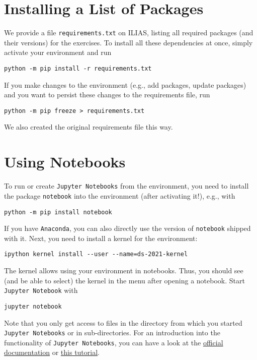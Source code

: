 \documentclass[12pt]{article}
\newcommand{\code}[1]{\textcolor{kitgreen}{\texttt{#1}}}
\begin{document}
\section{Installing a List of Packages}

We provide a file \code{requirements.txt} on ILIAS, listing all required packages (and their versions) for the exercises.
To install all these dependencies at once, simply activate your environment and run
%
\begin{lstlisting}[style=cmdblock]
python -m pip install -r requirements.txt
\end{lstlisting}
%
If you make changes to the environment (e.g., add packages, update packages) and you want to persist these changes to the requirements file, run
%
\begin{lstlisting}[style=cmdblock]
python -m pip freeze > requirements.txt
\end{lstlisting}
%
We also created the original requirements file this way.

\section{Using Notebooks}
\label{sec:notebooks}

To run or create \code{Jupyter Notebooks} from the environment, you need to install the package \code{notebook} into the environment (after activating it!), e.g., with
%
\begin{lstlisting}[style=cmdblock]
python -m pip install notebook
\end{lstlisting}
%
If you have \code{Anaconda}, you can also directly use the version of \code{notebook} shipped with it.
Next, you need to install a kernel for the environment:
%
\begin{lstlisting}[style=cmdblock]
ipython kernel install --user --name=ds-2021-kernel
\end{lstlisting}
%
The kernel allows using your environment in notebooks.
Thus, you should see (and be able to select) the kernel in the menu after opening a notebook.
Start \code{Jupyter Notebook} with
%
\begin{lstlisting}[style=cmdblock]
jupyter notebook
\end{lstlisting}
%
Note that you only get access to files in the directory from which you started \code{Jupyter Notebooks} or in sub-directories.
\newline
For an introduction into the functionality of \code{Jupyter Notebooks}, you can have a look at the \href{https://jupyter-notebook.readthedocs.io/en/stable/notebook.html#}{official documentation} or \href{https://realpython.com/jupyter-notebook-introduction/}{this tutorial}.
\end{document}
